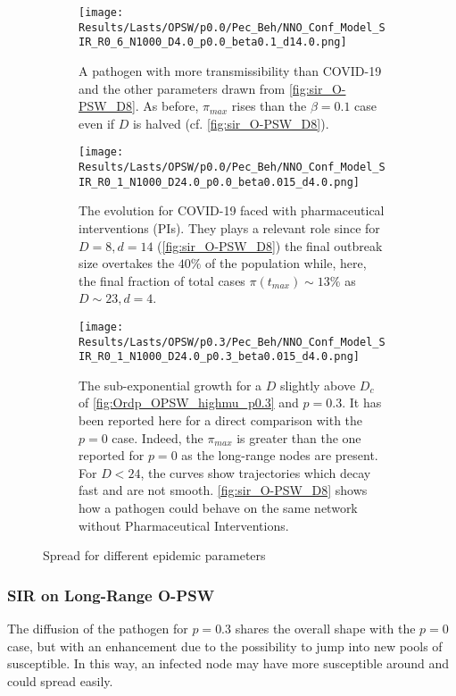 \documentclass[a4paper,10pt,twoside]{book} %
\theoremstyle{definition}
\begin{document}
\begin{figure}[htbp]
	\centering
	\begin{subfigure}{\linewidth}
		\centering
		\texttt{[image: Results/Lasts/OPSW/p0.0/Pec\_Beh/NNO\_Conf\_Model\_SIR\_R0\_6\_N1000\_D4.0\_p0.0\_beta0.1\_d14.0.png]}
		\caption{A pathogen with more transmissibility than COVID-19 and the other parameters drawn from \autoref{fig:sir_O-PSW_D8}. As before, $\pi_{max}$ rises than the $ \beta = 0.1$ case even if $ D$ is halved (cf. \autoref{fig:sir_O-PSW_D8}).}
		\label{fig:sir_O-PSW_D4_d14_b0.1}
	\end{subfigure}
	\vfill
	\begin{subfigure}[t]{\linewidth}
		\centering
		\texttt{[image: Results/Lasts/OPSW/p0.0/Pec\_Beh/NNO\_Conf\_Model\_SIR\_R0\_1\_N1000\_D24.0\_p0.0\_beta0.015\_d4.0.png]}
		\caption{The evolution for COVID-19 faced with pharmaceutical interventions (PIs). They plays a relevant role since for $ D = 8, d = 14$ (\autoref{fig:sir_O-PSW_D8}) the final outbreak size overtakes the $40 \% $ of the population while, here, the final fraction of total cases $\pi(t_{max})\sim 13\%$ as $D \sim 23, d = 4$.}
		\label{fig:sir_O-PSW_D24_d4}
	\end{subfigure}
	\vfill
	\begin{subfigure}{\linewidth}
		\centering
		\texttt{[image: Results/Lasts/OPSW/p0.3/Pec\_Beh/NNO\_Conf\_Model\_SIR\_R0\_1\_N1000\_D24.0\_p0.3\_beta0.015\_d4.0.png]}
		\caption{The sub-exponential growth for a $D$ slightly above $D_c$ of \autoref{fig:Ordp_OPSW_highmu_p0.3} and $p = 0.3.$ It has been reported here for a direct comparison with the $p = 0$ case. Indeed, the $ \pi_{max} $ is greater than the one reported for $ p= 0$ as the long-range nodes are present. For $ D < 24$, the curves show trajectories which decay fast and are not smooth. \autoref{fig:sir_O-PSW_D8} shows how a pathogen could behave on the same network without Pharmaceutical Interventions.}
		\label{fig:sir_O-PSW_D24_d4_p0.3}
	\end{subfigure}
	\caption{Spread for different epidemic parameters}
	\label{fig:OPSW_COVID_p0.3}
\end{figure}

\clearpage
\subsubsection*{SIR on Long-Range O-PSW}
The diffusion of the pathogen for $p = 0.3$ shares the overall shape with the $p = 0$ case, but with an enhancement due to the possibility to jump into new pools of susceptible. In this way, an infected node may have more susceptible around and could spread easily.
\end{document}
